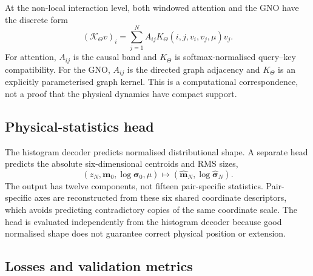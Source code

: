 At the non-local interaction level, both windowed attention and the GNO have the discrete form
\begin{equation}
    (\mathcal{K}_{\Theta}v)_i
    =
    \sum_{j=1}^{N}
    A_{ij}K_{\Theta}(i,j,v_i,v_j,\mu)v_j.
    \label{eq:common_discrete_kernel}
\end{equation}
For attention, $A_{ij}$ is the causal band and $K_{\Theta}$ is softmax-normalised query--key compatibility. For the GNO, $A_{ij}$ is the directed graph adjacency and $K_{\Theta}$ is an explicitly parameterised graph kernel. This is a computational correspondence, not a proof that the physical dynamics have compact support.

\subsection{Physical-statistics head}
\label{subsec:physical_statistics_head}

The histogram decoder predicts normalised distributional shape. A separate head predicts the absolute six-dimensional centroids and RMS sizes,
\begin{equation}
    (z_N,\bm m_0,\log\bm\sigma_0,\mu)
    \longmapsto
    (\widehat{\bm m}_N,\log\widehat{\bm\sigma}_N).
    \label{eq:physical_head_mapping}
\end{equation}
The output has twelve components, not fifteen pair-specific statistics. Pair-specific axes are reconstructed from these six shared coordinate descriptors, which avoids predicting contradictory copies of the same coordinate scale. The head is evaluated independently from the histogram decoder because good normalised shape does not guarantee correct physical position or extension.

\subsection{Losses and validation metrics}
\label{subsec:losses_metrics}

